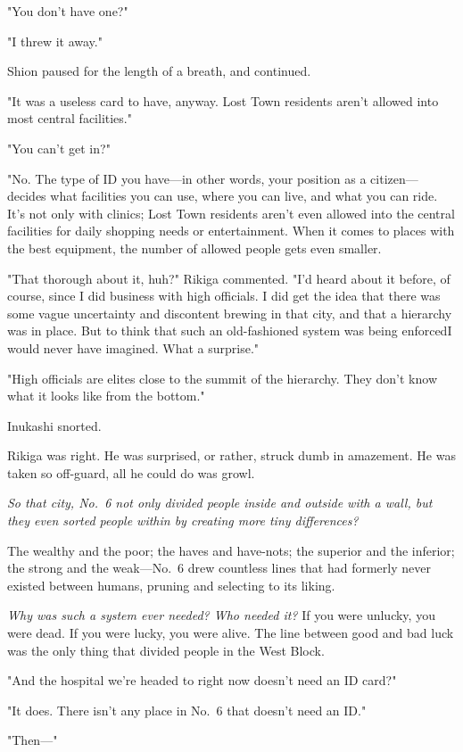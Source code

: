 "You don't have one?"

"I threw it away."

Shion paused for the length of a breath, and continued.

"It was a useless card to have, anyway. Lost Town residents aren't
allowed into most central facilities."

"You can't get in?"

"No. The type of ID you have---in other words, your position as a
citizen---decides what facilities you can use, where you can live, and
what you can ride. It's not only with clinics; Lost Town residents
aren't even allowed into the central facilities for daily shopping needs
or entertainment. When it comes to places with the best equipment, the
number of allowed people gets even smaller.

"That thorough about it, huh?" Rikiga commented. "I'd heard about it
before, of course, since I did business with high officials. I did get
the idea that there was some vague uncertainty and discontent brewing in
that city, and that a hierarchy was in place. But to think that such an
old-fashioned system was being enforced\el I would never have imagined.
What a surprise."

"High officials are elites close to the summit of the hierarchy. They
don't know what it looks like from the bottom."

Inukashi snorted.

Rikiga was right. He was surprised, or rather, struck dumb in amazement.
He was taken so off-guard, all he could do was growl.

\emph{So that city, No.~6 not only divided people inside and outside with a
wall, but they even sorted people within by creating more tiny
differences?}

The wealthy and the poor; the haves and have-nots; the superior and the
inferior; the strong and the weak---No.~6 drew countless lines that had
formerly never existed between humans, pruning and selecting to its
liking.

\emph{Why was such a system ever needed? Who needed it?} If you were unlucky,
you were dead. If you were lucky, you were alive. The line between good
and bad luck was the only thing that divided people in the West Block.

"And the hospital we're headed to right now doesn't need an ID card?"

"It does. There isn't any place in No.~6 that doesn't need an ID."

"Then---"

